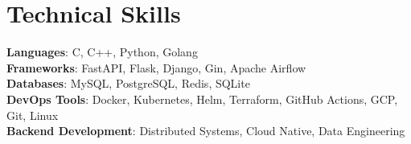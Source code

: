 \documentclass[letterpaper,11pt]{article}
\newcommand{\resumeSubHeadingListEnd}{\end{itemize}}
\begin{document}


%
\section{Technical Skills}
 \begin{itemize}[leftmargin=0.15in, label={}]
    \small{\item{
     \textbf{Languages}{: C, C++, Python, Golang} \\
     \textbf{Frameworks}{: FastAPI, Flask, Django, Gin, Apache Airflow} \\
     \textbf{Databases}{: MySQL, PostgreSQL, Redis, SQLite } \\
     \textbf{DevOps Tools}{: Docker, Kubernetes, Helm, Terraform, GitHub Actions, GCP, Git, Linux} \\
     \textbf{Backend Development}{: Distributed Systems, Cloud Native, Data Engineering} \\
    }}
 \end{itemize}


\end{document}
